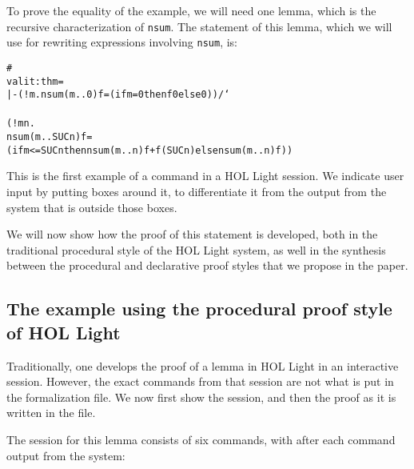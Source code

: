 \documentclass{LMCS}
\let\xmedskip=\medskip
\def\toolong{}
\def\tstrut{{\vrule height8.5pt depth3pt width0pt}}
\def\lam{\char`\\}
\def\}{\char`\}}
\def\treturn{}
\def\treturn{\hspace{-.5pt}}
\begin{document}
To prove the equality of the example, we will need one lemma,
which is the recursive characterization of \texttt{nsum}.
The statement of this lemma, which we will use for rewriting expressions
involving \texttt{nsum}, is:
\xmedskip
\begin{alltt}\small
# \fbox{NSUM_CLAUSES_NUMSEG;;\treturn\tstrut}\smallskip
val it : thm =
  |- (!m. nsum (m..0) f = (if m = 0 then f 0 else 0)) /{\lam}
     (!m n.
          nsum (m..SUC n) f =
          (if m <= SUC n then nsum (m..n) f + f (SUC n) else nsum (m..n) f))\toolong
\end{alltt}
\xmedskip
This is the first example of a command in a HOL Light session.
We indicate user input by putting boxes around it, to differentiate
it from the output from the system that is outside those boxes.

We will now show how the proof of this statement is developed, both
in the traditional procedural style of the HOL Light system,
as well in the synthesis between the procedural and declarative proof
styles that we propose in the paper.



\subsection*{The example using the procedural proof style of HOL Light}

\noindent
Traditionally, one develops the proof of a lemma in HOL Light in
an interactive session.
However, the exact commands from that session are not what is put
in the formalization file.
We now first show the session, and then the proof as it is written
in the file.

The session for this lemma consists of six commands, with after
each command output from the system:
\end{document}
